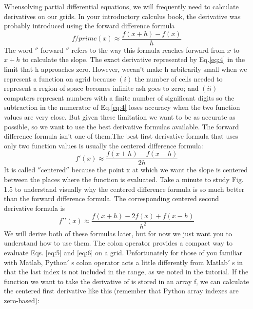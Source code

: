 	     Whensolving partial differential equations, we will frequently need to calculate derivatives on our grids. In your introductory calculus book, the derivative was probably introduced using the forward difference formula
		\begin{equation} \label{eq:4}
			f/prime(x) \approx \frac{f(x+h) - f(x)}{h}
		\end{equation}		     
     The word 	$''$ forward	$''$  refers to the way this formula reaches forward from $x$ to $x+h$ to calculate the slope. The exact derivative represented by Eq.\eqref{eq:4} in the limit that h approaches zero. However, wecan\rq t make h arbitrarily small when we represent a function on agrid because $(i)$ the number of cells needed to represent a region of space becomes infinite ash goes to zero; and $(ii)$ computers represent numbers with a finite number of significant digits so the subtraction in the numerator of Eq.\eqref{eq:4} loses accuracy when the two function values are very close. But given these limitation we want to be as accurate as possible, so we want to use the best derivative formulas available. The forward difference formula isn’t one of them.The best first derivative formula that uses only two function values is usually the centered difference formula:
     \begin{equation} \label{eq:5}
     	f\prime(x) \approx \frac{f(x+h)-f(x-h)}{2h} 
     \end{equation}
     It is called $''$centered$''$ because the point x at which we want the slope is centered between the places where the function is evaluated. Take a minute to study Fig. 1.5 to understand visually why the centered difference formula is so much better than the forward difference formula. The corresponding centered second derivative formula is
\begin{equation} \label{eq:6}
	f\prime\prime(x) \approx \frac{f(x+h) - 2f(x)+f(x-h)}{h^2}
\end{equation}
We will derive both of these formulas later, but for now we just want you to understand how to use them. The colon operator provides a compact way to evaluate Eqs. \eqref{eq:5} and \eqref{eq:6} on a grid. Unfortunately for those of you familiar with Matlab, Python$'$ s colon operator acts a little differently from Matlab$'$ s in that the last index is not included in the range, as we noted in the tutorial. If the function we want to take the derivative of is stored in an array f, we can calculate the centered first derivative like this (remember that Python array indexes are zero-based):

